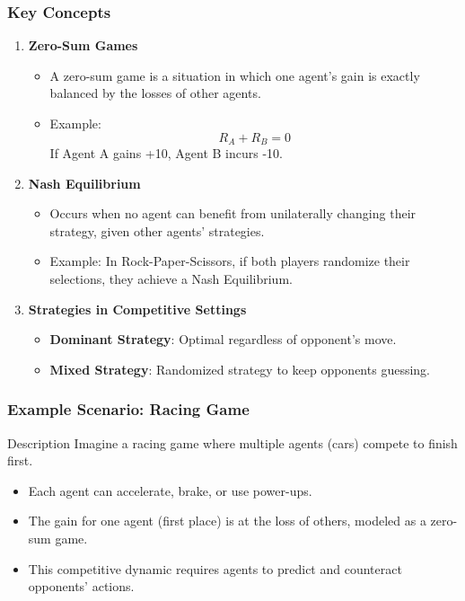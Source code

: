 \documentclass[aspectratio=169]{beamer}
\begin{document}
\begin{frame}[fragile]
    \frametitle{Key Concepts}
    \begin{enumerate}
        \item \textbf{Zero-Sum Games}
        \begin{itemize}
            \item A zero-sum game is a situation in which one agent's gain is exactly balanced by the losses of other agents.
            \item Example: 
            \begin{equation}
                R_A + R_B = 0
            \end{equation}
            If Agent A gains +10, Agent B incurs -10.
        \end{itemize}

        \item \textbf{Nash Equilibrium}
        \begin{itemize}
            \item Occurs when no agent can benefit from unilaterally changing their strategy, given other agents' strategies.
            \item Example: In Rock-Paper-Scissors, if both players randomize their selections, they achieve a Nash Equilibrium.
        \end{itemize}

        \item \textbf{Strategies in Competitive Settings}
        \begin{itemize}
            \item \textbf{Dominant Strategy}: Optimal regardless of opponent's move.
            \item \textbf{Mixed Strategy}: Randomized strategy to keep opponents guessing.
        \end{itemize}
    \end{enumerate}
\end{frame}

\begin{frame}[fragile]
    \frametitle{Example Scenario: Racing Game}
    \begin{block}{Description}
        Imagine a racing game where multiple agents (cars) compete to finish first.
    \end{block}
    \begin{itemize}
        \item Each agent can accelerate, brake, or use power-ups.
        \item The gain for one agent (first place) is at the loss of others, modeled as a zero-sum game.
        \item This competitive dynamic requires agents to predict and counteract opponents' actions.
    \end{itemize}
\end{frame}
\end{document}
